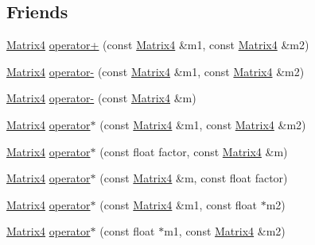 \subsection*{Friends}
\begin{DoxyCompactItemize}
\item 
\hyperlink{classprism_1_1geometry_1_1_matrix4}{Matrix4} \hyperlink{classprism_1_1geometry_1_1_matrix4_afc2bce19b13471f0cac1a48c2932af60}{operator+} (const \hyperlink{classprism_1_1geometry_1_1_matrix4}{Matrix4} \&m1, const \hyperlink{classprism_1_1geometry_1_1_matrix4}{Matrix4} \&m2)
\item 
\hyperlink{classprism_1_1geometry_1_1_matrix4}{Matrix4} \hyperlink{classprism_1_1geometry_1_1_matrix4_a2e7720348e3d34cad4119b93c499971e}{operator-\/} (const \hyperlink{classprism_1_1geometry_1_1_matrix4}{Matrix4} \&m1, const \hyperlink{classprism_1_1geometry_1_1_matrix4}{Matrix4} \&m2)
\item 
\hyperlink{classprism_1_1geometry_1_1_matrix4}{Matrix4} \hyperlink{classprism_1_1geometry_1_1_matrix4_a9d189e964a989207c8489e80276dadd4}{operator-\/} (const \hyperlink{classprism_1_1geometry_1_1_matrix4}{Matrix4} \&m)
\item 
\hyperlink{classprism_1_1geometry_1_1_matrix4}{Matrix4} \hyperlink{classprism_1_1geometry_1_1_matrix4_af33d4af5371e50d645cd647e02912f28}{operator$\ast$} (const \hyperlink{classprism_1_1geometry_1_1_matrix4}{Matrix4} \&m1, const \hyperlink{classprism_1_1geometry_1_1_matrix4}{Matrix4} \&m2)
\item 
\hyperlink{classprism_1_1geometry_1_1_matrix4}{Matrix4} \hyperlink{classprism_1_1geometry_1_1_matrix4_aefe58d9157e2f7ac266b357a5db4e986}{operator$\ast$} (const float factor, const \hyperlink{classprism_1_1geometry_1_1_matrix4}{Matrix4} \&m)
\item 
\hyperlink{classprism_1_1geometry_1_1_matrix4}{Matrix4} \hyperlink{classprism_1_1geometry_1_1_matrix4_aeec24c93fae98db6ade9c1dd738ef3e7}{operator$\ast$} (const \hyperlink{classprism_1_1geometry_1_1_matrix4}{Matrix4} \&m, const float factor)
\item 
\hyperlink{classprism_1_1geometry_1_1_matrix4}{Matrix4} \hyperlink{classprism_1_1geometry_1_1_matrix4_a023b29b55ee669aa94f8bbc9131923ce}{operator$\ast$} (const \hyperlink{classprism_1_1geometry_1_1_matrix4}{Matrix4} \&m1, const float $\ast$m2)
\item 
\hyperlink{classprism_1_1geometry_1_1_matrix4}{Matrix4} \hyperlink{classprism_1_1geometry_1_1_matrix4_a26ce7e4aed9bc5780ebb8411acce6583}{operator$\ast$} (const float $\ast$m1, const \hyperlink{classprism_1_1geometry_1_1_matrix4}{Matrix4} \&m2)

\end{DoxyCompactItemize}
